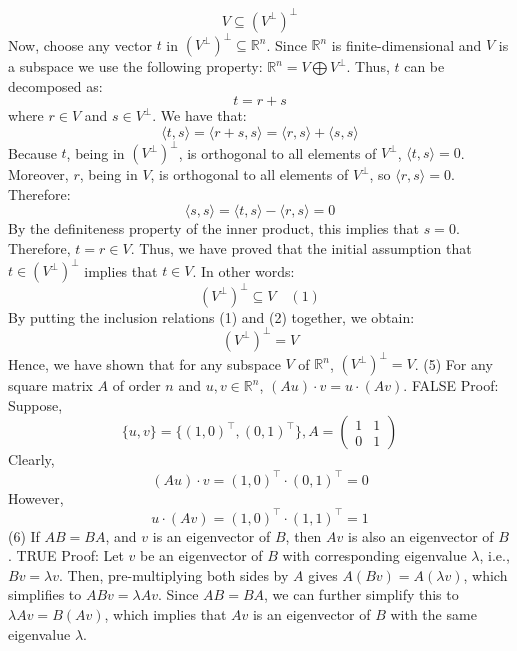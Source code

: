 \documentclass{article}
\begin{document}
$$V \subseteq (V^\perp)^\perp$$
Now, choose any vector \(t\) in \((V^\perp)^\perp \subseteq \mathbb{R}^n\). Since \(\mathbb{R}^n\) is finite-dimensional and \(V\) is a subspace we use the following property: $\mathbb{R}^n = V \bigoplus V^\perp$. Thus, \(t\) can be decomposed as:
\[ t = r + s \]
where \(r \in V\) and \(s \in V^\perp\).
We have that:
\[ \langle t, s \rangle = \langle r + s, s \rangle = \langle r, s \rangle + \langle s, s \rangle \]
Because \(t\), being in \((V^\perp)^\perp\), is orthogonal to all elements of \(V^\perp\), \(\langle t, s \rangle = 0\). Moreover, \(r\), being in \(V\), is orthogonal to all elements of \(V^\perp\), so \(\langle r, s \rangle = 0\). Therefore:
\[ \langle s, s \rangle = \langle t, s \rangle - \langle r, s \rangle = 0 \]
By the definiteness property of the inner product, this implies that \(s = 0\). Therefore, \(t = r \in V\). Thus, we have proved that the initial assumption that \(t \in (V^\perp)^\perp\) implies that \(t \in V\). In other words:
\[ (V^\perp)^\perp \subseteq V \quad (1) \]
By putting the inclusion relations (1) and (2) together, we obtain:
\[ (V^\perp)^\perp = V \]
Hence, we have shown that for any subspace \(V\) of \(\mathbb{R}^n\), \((V^\perp)^\perp = V\).
\newline
\newline
(5) For any square matrix \(A\) of order \(n\) and \(u,v \in \mathbb{R}^n\), \((Au) \cdot v = u \cdot (Av)\). FALSE
\newline
Proof: Suppose,
$$\{u, v\} = \{(1, 0)^\top, (0, 1)^\top\}, A = 
\left(\begin{array}{cc}
      1 & 1\\
      0 & 1
    \end{array}\right)$$
Clearly,
$$(Au) \cdot v = (1, 0)^\top \cdot (0, 1)^\top = 0$$ 
However,
$$u \cdot (Av) = (1, 0)^\top \cdot (1, 1)^\top = 1$$ 
\newline
\newline
(6) If \(AB = BA\), and \(v\) is an eigenvector of \(B\), then \(Av\) is also an eigenvector of \(B\). TRUE
\newline
Proof: Let \(v\) be an eigenvector of \(B\) with corresponding eigenvalue \(\lambda\), i.e., \(Bv = \lambda v\). Then, pre-multiplying both sides by \(A\) gives \(A(Bv) = A(\lambda v)\), which simplifies to \(ABv = \lambda Av\). Since \(AB = BA\), we can further simplify this to \(\lambda Av = B(Av)\), which implies that \(Av\) is an eigenvector of \(B\) with the same eigenvalue \(\lambda\).
\newline
\newline
\end{document}
